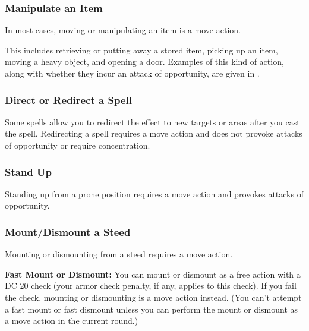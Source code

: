 \subsubsection{Manipulate an Item}
In most cases, moving or manipulating an item is a move action.

This includes retrieving or putting away a stored item, picking up an item, moving a heavy object, and opening a door. Examples of this kind of action, along with whether they incur an attack of opportunity, are given in .

\subsubsection{Direct or Redirect a Spell}
Some spells allow you to redirect the effect to new targets or areas after you cast the spell. Redirecting a spell requires a move action and does not provoke attacks of opportunity or require concentration.

\subsubsection{Stand Up}
Standing up from a prone position requires a move action and provokes attacks of opportunity.

\subsubsection{Mount/Dismount a Steed}
Mounting or dismounting from a steed requires a move action.

\textbf{Fast Mount or Dismount:} You can mount or dismount as a free action with a DC 20  check (your armor check penalty, if any, applies to this check). If you fail the check, mounting or dismounting is a move action instead. (You can't attempt a fast mount or fast dismount unless you can perform the mount or dismount as a move action in the current round.)

